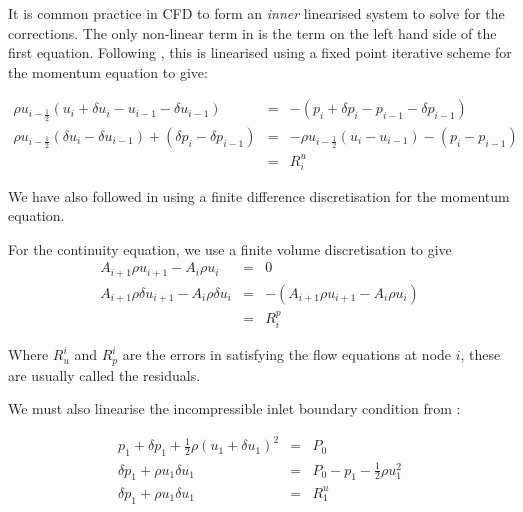 It is common practice in CFD to form an {\it inner} linearised system
to solve for the corrections. The only non-linear term in  is
the term on the left hand side of the first equation. 
Following \cite{gupta1993development},
this is linearised using a fixed point iterative scheme for the momentum equation to give:

\begin{equation}
  \begin{array}{rcl}
    \rho u_{i-\frac{1}{2}} (u_i + \delta u_i - u_{i-1} - \delta u_{i-1}) &=&
                   - (p_i + \delta p_i - p_{i-1} - \delta p_{i-1} ) \\[8pt]
    \rho u_{i-\frac{1}{2}} (\delta u_i - \delta u_{i-1}) +
    (\delta p_i - \delta p_{i-1}) &=&
    -\rho u_{i-\frac{1}{2}} (u_i - u_{i-1}) -
    (p_i - p_{i-1}) \\[8pt]
    &=& R_i^u
  \end{array}
  \label{eqn-euler-1d-disc2}
\end{equation}

We have also followed \cite{gupta1993development} in using a finite difference
discretisation for the momentum equation.

For the continuity equation, we use a finite volume discretisation to give
\begin{equation}
  \begin{array}{rcl}
    A_{i+1}\rho u_{i+1} - A_{i}\rho u_{i} &=& 0 \\[8pt]
    A_{i+1}\rho \delta u_{i+1} - A_{i}\rho \delta u_{i} &=&
    -(A_{i+1}\rho u_{i+1} - A_{i}\rho u_{i}) \\[8pt]
    &=& R_i^p
  \end{array}
  \label{eqn-euler-1d-disc3}
\end{equation}

Where $R_u^i$ and $R_p^i$ are the errors in satisfying the flow equations at node $i$,
these are usually called the residuals.

We must also linearise the incompressible inlet boundary condition from :

\begin{equation}
  \begin{array}{rcl}
    p_1 + \delta p_1 + \frac{1}{2} \rho (u_1 + \delta u_1) ^2 &=& P_0 \\[8pt]
          \delta p_1 + \rho u_1 \delta u _1&=& P_0 - p_1 - \frac{1}{2} \rho u_1^2 \\[8pt]
          \delta p_1 + \rho u_1 \delta u_1 &=& R^u_1
  \end{array}
  \label{eqn-incomp-in-disc1}
\end{equation}

